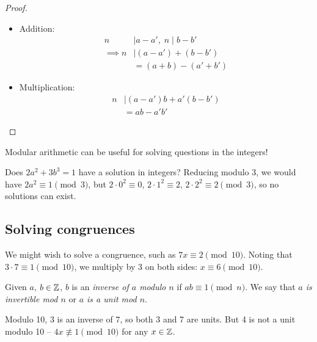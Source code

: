 \documentclass{../template/note}
\begin{document}
    \begin{proof}
        \begin{itemize}
            \item Addition:
            \begin{align*}
                n &\mid a - a',\; n \mid b - b' \\
                \implies n &\mid (a - a') + (b - b') \\
                &= (a + b) - (a' + b')
            \end{align*}
            \item Multiplication:
            \begin{align*}
                n &\mid (a - a')b + a'(b - b') \\
                &= ab - a'b'
            \end{align*}            
        \end{itemize}        
    \end{proof}
    
    Modular arithmetic can be useful for solving questions in the integers!

    \begin{example}
        Does \(2a^2 + 3b^3 = 1\) have a solution in integers? Reducing modulo 3, we would have \(2a^2 \equiv 1 \pmod 3\), but \(2 \cdot 0^2 \equiv 0\), \(2 \cdot 1^2 \equiv 2\), \(2 \cdot 2^2 \equiv 2 \pmod 3\), so no solutions can exist.
    \end{example}
    

    \subsection{Solving congruences}

    We might wish to solve a congruence, such as \(7x \equiv 2 \pmod {10}\). Noting that \(3 \cdot 7 \equiv 1 \pmod {10}\), we multiply by 3 on both sides: \(x \equiv 6 \pmod {10}\).

    \begin{definition}
        Given \(a\), \(b \in \mathbb Z\), \(b\) is an \emph{inverse of \(a\) modulo \(n\)} if \(ab \equiv 1 \pmod n\). We say that \emph{\(a\) is invertible mod \(n\)} or \emph{\(a\) is a unit mod \(n\)}.
    \end{definition}
    
    \begin{example}
        Modulo 10, \(3\) is an inverse of \(7\), so both 3 and 7 are units. But 4 is not a unit modulo 10 -- \(4x \not\equiv 1 \pmod {10}\) for any \(x \in \mathbb Z\).
    \end{example}
\end{document}

